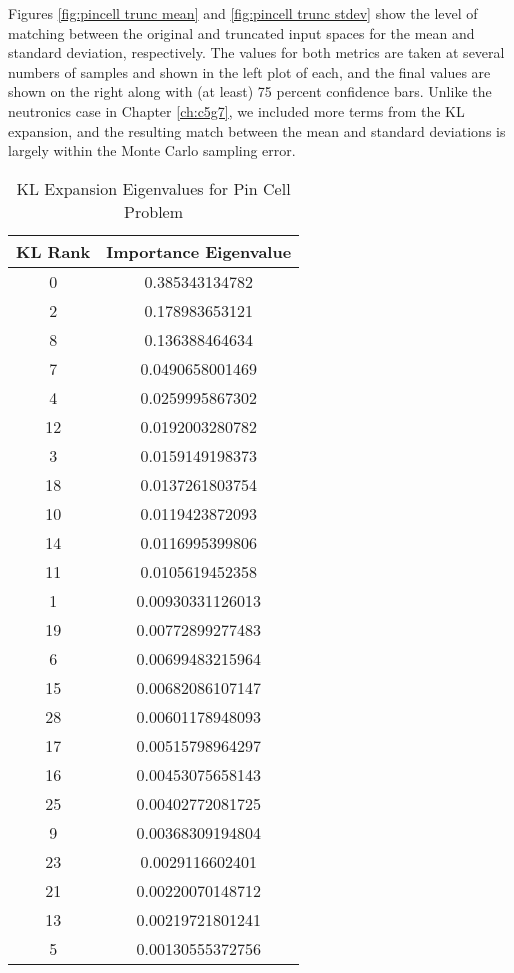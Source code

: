 Figures \ref{fig:pincell trunc mean} and \ref{fig:pincell trunc stdev} show the level of matching between the
original and truncated input spaces for the mean and standard deviation, respectively.  The values for both
metrics are taken at several numbers of samples and shown in the left plot of each, and the final values are
shown on the right along with (at least) 75 percent confidence bars.  Unlike the neutronics case in Chapter
\ref{ch:c5g7}, we included more terms from the KL expansion, and the resulting match between the mean and
standard deviations is largely within the Monte Carlo sampling error.
\begin{table}[H]
  \centering
  \begin{tabular}{c|c}
KL Rank & Importance Eigenvalue \\ \hline
0 & 0.385343134782 \\
2 & 0.178983653121 \\
8 & 0.136388464634 \\
7 & 0.0490658001469 \\
4 & 0.0259995867302 \\
12 & 0.0192003280782 \\
3 & 0.0159149198373 \\
18 & 0.0137261803754 \\
10 & 0.0119423872093 \\
14 & 0.0116995399806 \\
11 & 0.0105619452358 \\
1 & 0.00930331126013 \\
19 & 0.00772899277483 \\
6 & 0.00699483215964 \\
15 & 0.00682086107147 \\
28 & 0.00601178948093 \\
17 & 0.00515798964297 \\
16 & 0.00453075658143 \\
25 & 0.00402772081725 \\
9 & 0.00368309194804 \\ \hline
23 & 0.0029116602401 \\
21 & 0.00220070148712 \\
13 & 0.00219721801241 \\
5 & 0.00130555372756
\end{tabular}
\caption{KL Expansion Eigenvalues for Pin Cell Problem}
\label{tab:pcarank}
\end{table}

